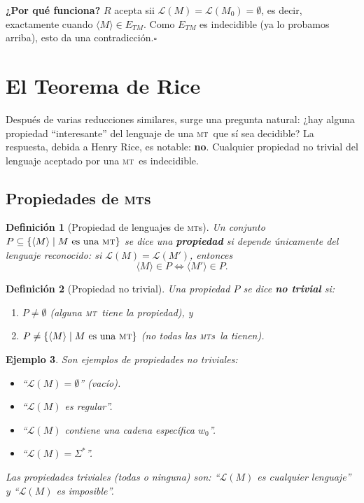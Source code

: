 \documentclass[11pt,a4paper]{article}
\theoremstyle{definicion}
\newtheorem{definicion}{Definición}[section]
\newtheorem{ejemplo}[definicion]{Ejemplo}
\newcommand{\MT}{\textsc{mt}}
\newcommand{\MTs}{\textsc{mt}s}
\newcommand{\enc}[1]{\langle #1 \rangle}
\newcommand{\Lang}{\mathcal{L}}
\begin{document}
\textbf{¿Por qué funciona?} $R$ acepta sii $\Lang(M) = \Lang(M_0) = \emptyset$, es decir, exactamente cuando $\enc{M} \in E_{TM}$. Como $E_{TM}$ es indecidible (ya lo probamos arriba), esto da una contradicción.\hfill$\square$

\section{El Teorema de Rice}

Después de varias reducciones similares, surge una pregunta natural: ¿hay alguna propiedad ``interesante'' del lenguaje de una \MT\ que sí sea decidible? La respuesta, debida a Henry Rice, es notable: \textbf{no}. Cualquier propiedad no trivial del lenguaje aceptado por una \MT\ es indecidible.

\subsection{Propiedades de \MTs}

\begin{definicion}[Propiedad de lenguajes de \MTs]
Un conjunto $P \subseteq \{ \enc{M} \mid M \text{ es una \MT} \}$ se dice una \textbf{propiedad} si \emph{depende únicamente del lenguaje reconocido}: si $\Lang(M) = \Lang(M')$, entonces
\[
\enc{M} \in P \iff \enc{M'} \in P.
\]
\end{definicion}

\begin{definicion}[Propiedad no trivial]
Una propiedad $P$ se dice \textbf{no trivial} si:
\begin{enumerate}
    \item $P \neq \emptyset$ (alguna \MT\ tiene la propiedad), y
    \item $P \neq \{ \enc{M} \mid M \text{ es una \MT}\}$ (no \emph{todas} las \MTs\ la tienen).
\end{enumerate}
\end{definicion}

\begin{ejemplo}
Son ejemplos de propiedades no triviales:
\begin{itemize}
    \item ``$\Lang(M) = \emptyset$'' (vacío).
    \item ``$\Lang(M)$ es regular''.
    \item ``$\Lang(M)$ contiene una cadena específica $w_0$''.
    \item ``$\Lang(M) = \Sigma^*$''.
\end{itemize}
Las propiedades \emph{triviales} (todas o ninguna) son: ``$\Lang(M)$ es cualquier lenguaje'' y ``$\Lang(M)$ es imposible''.
\end{ejemplo}
\end{document}
